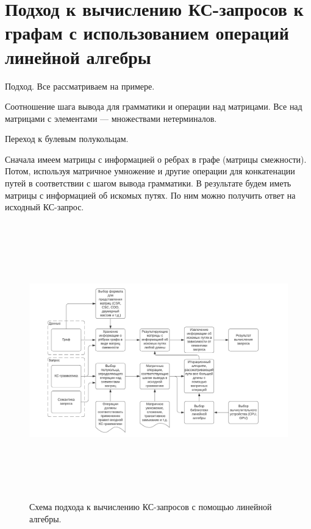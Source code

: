 \chapter{Подход к вычислению КС-запросов к графам с использованием операций линейной алгебры}\label{ch:ch2}

Подход. Все рассматриваем на примере.

Соотношение шага вывода для грамматики и операции над матрицами. Все над матрицами с элементами --- множествами нетерминалов.

Переход к булевым полукольцам.


Сначала имеем матрицы с информацией о ребрах в графе (матрицы смежности). Потом, используя матричное умножение и другие операции для конкатенации путей в соответствии с шагом вывода грамматики. В результате будем иметь матрицы с информацией об искомых путях. По ним можно получить ответ на исходный КС-запрос.


	\begin{figure}
		\begin{center}
		\includegraphics[height=12cm]{dissertation/images/schema.pdf}
	\end{center}
	\caption{Схема подхода к вычислению КС-запросов с помощью линейной алгебры.}
	\end{figure}

	


\FloatBarrier
